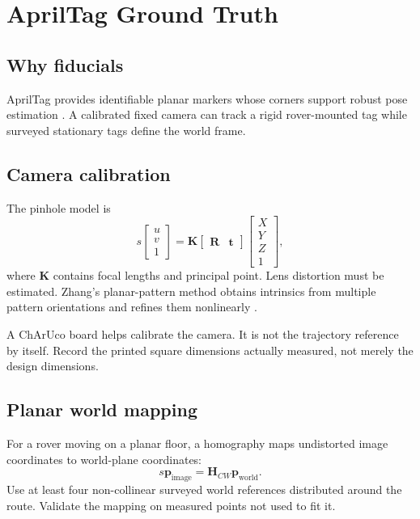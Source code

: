 \documentclass[11pt,oneside]{book}
\newcommand{\vect}[1]{\bm{#1}}
\begin{document}
\chapter{AprilTag Ground Truth}

\section{Why fiducials}

AprilTag provides identifiable planar markers whose corners support robust
pose estimation \cite{olson2011apriltag,wang2016apriltag2}. A calibrated fixed
camera can track a rigid rover-mounted tag while surveyed stationary tags
define the world frame.

\section{Camera calibration}

The pinhole model is
\[
s
\begin{bmatrix}u\\v\\1\end{bmatrix}
=
\vect{K}
\begin{bmatrix}\vect{R}&\vect{t}\end{bmatrix}
\begin{bmatrix}X\\Y\\Z\\1\end{bmatrix},
\]
where $\vect{K}$ contains focal lengths and principal point. Lens distortion
must be estimated. Zhang's planar-pattern method obtains intrinsics from
multiple pattern orientations and refines them nonlinearly
\cite{zhang2000calibration}.

A ChArUco board helps calibrate the camera. It is not the trajectory reference
by itself. Record the printed square dimensions actually measured, not merely
the design dimensions.

\section{Planar world mapping}

For a rover moving on a planar floor, a homography maps undistorted image
coordinates to world-plane coordinates:
\[
s\vect{p}_{\mathrm{image}}=\vect{H}_{CW}\vect{p}_{\mathrm{world}}.
\]
Use at least four non-collinear surveyed world references distributed around
the route. Validate the mapping on measured points not used to fit it.
\end{document}
